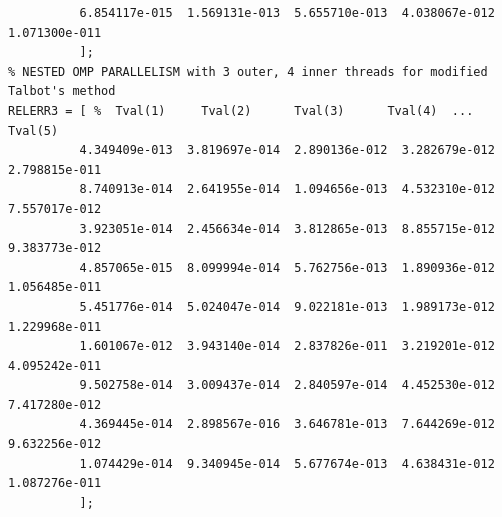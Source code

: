 \documentclass[a4paper,10pt]{report}%
\begin{document}
\begin{lstlisting}
          6.854117e-015  1.569131e-013  5.655710e-013  4.038067e-012  1.071300e-011
          ];
% NESTED OMP PARALLELISM with 3 outer, 4 inner threads for modified Talbot's method
RELERR3 = [ %  Tval(1)     Tval(2)      Tval(3)      Tval(4)  ... Tval(5)
          4.349409e-013  3.819697e-014  2.890136e-012  3.282679e-012  2.798815e-011
          8.740913e-014  2.641955e-014  1.094656e-013  4.532310e-012  7.557017e-012
          3.923051e-014  2.456634e-014  3.812865e-013  8.855715e-012  9.383773e-012
          4.857065e-015  8.099994e-014  5.762756e-013  1.890936e-012  1.056485e-011
          5.451776e-014  5.024047e-014  9.022181e-013  1.989173e-012  1.229968e-011
          1.601067e-012  3.943140e-014  2.837826e-011  3.219201e-012  4.095242e-011
          9.502758e-014  3.009437e-014  2.840597e-014  4.452530e-012  7.417280e-012
          4.369445e-014  2.898567e-016  3.646781e-013  7.644269e-012  9.632256e-012
          1.074429e-014  9.340945e-014  5.677674e-013  4.638431e-012  1.087276e-011
          ];
\end{lstlisting}
\end{document}

